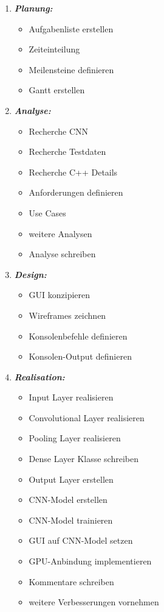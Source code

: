 \begin{enumerate} 
	\item \textbf{\emph{Planung:}} 
	\begin{itemize} 
		\item Aufgabenliste erstellen
		\item Zeiteinteilung 
		\item Meilensteine definieren 
		\item Gantt erstellen 
	\end{itemize} 
	\item \textbf{\emph{Analyse:}} 
	\begin{itemize} 
		\item Recherche CNN 
		\item Recherche Testdaten 
		\item Recherche C++ Details 
		\item Anforderungen definieren 
		\item Use Cases 
		\item weitere Analysen 
		\item Analyse schreiben
	\end{itemize} 
	\item \textbf{\emph{Design:}} 
	\begin{itemize} 
		\item GUI konzipieren 
		\item Wireframes zeichnen 
		\item Konsolenbefehle definieren 
		\item Konsolen-Output definieren 
	\end{itemize}
	\item \textbf{\emph{Realisation:}} 
	\begin{itemize} 
		\item Input Layer realisieren 
		\item Convolutional Layer realisieren 
		\item Pooling Layer realisieren 
		\item Dense Layer Klasse schreiben 
		\item Output Layer erstellen 
		\item CNN-Model erstellen 
		\item CNN-Model trainieren 
		\item GUI auf CNN-Model setzen 
		\item GPU-Anbindung implementieren 
		\item Kommentare schreiben 
		\item weitere Verbesserungen vornehmen 

\end{itemize}
\end{enumerate}
